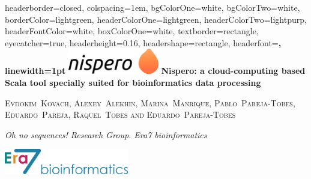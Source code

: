 \documentclass[portrait,a0paper,fontscale=0.285]{baposter} %
\begin{document}
\begin{poster}
{
headerborder=closed, %
colspacing=1em, %
bgColorOne=white, %
bgColorTwo=white, %
borderColor=lightgreen, %
headerColorOne=lightgreen, %
headerColorTwo=lightpurp, %
headerFontColor=white, %
boxColorOne=white, %
textborder=rectangle, %
eyecatcher=true, %
headerheight=0.16\textheight, %
headershape=rectangle, %
headerfont=\Large\bf\textsc, %
linewidth=1pt %
}
%
{\includegraphics[height=3em]{nispero.png}} %
{\bf{Nispero: a cloud-computing based Scala tool specially suited for bioinformatics data
processing\vspace{0.333em}}
}
{\large\textsc{Evdokim~Kovach, Alexey~Alekhin, Marina~Manrique, Pablo~Pareja-Tobes, Eduardo~Pareja, Raquel~Tobes and Eduardo~Pareja-Tobes \vspace{0.333em}}

{\itshape\small Oh no sequences! Research Group. Era7 bioinformatics}
} %
{\includegraphics[height=3em]{era7.png}} %



\end{poster}
\end{document}
